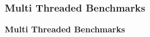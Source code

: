 \documentclass[
	aspectratio=169,
	compress,
]{beamer}
\newcommand{\navframetitle}[1]{\frametitle{#1\hfill{\footnotesize\lastsection{}}}}
\begin{document}

\begin{frame}[fragile]
	\navframetitle{Multi Threaded Benchmarks}

	\textbf{Multi Threaded Benchmarks}
\end{frame}

%
\end{document}
